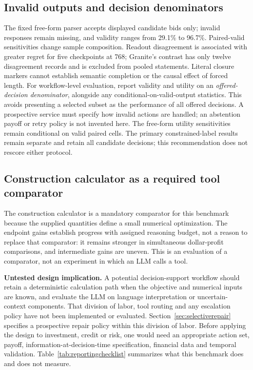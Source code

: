 \documentclass[sigconf,anonymous,nonacm]{acmart}
\begin{document}
\subsection{Invalid outputs and decision denominators}
The fixed free-form parser accepts displayed candidate bids only; invalid responses remain missing, and validity ranges from 29.1\% to 96.7\%. Paired-valid sensitivities change sample composition. Readout disagreement is associated with greater regret for five checkpoints at 768; Granite's contrast has only twelve disagreement records and is excluded from pooled statements. Literal closure markers cannot establish semantic completion or the causal effect of forced length.
For workflow-level evaluation, report validity and utility on an \emph{offered-decision denominator}, alongside any conditional-on-valid-output statistics. This avoids presenting a selected subset as the performance of all offered decisions. A prospective service must specify how invalid actions are handled; an abstention payoff or retry policy is not invented here. The free-form utility sensitivities remain conditional on valid paired cells. The primary constrained-label results remain separate and retain all candidate decisions; this recommendation does not rescore either protocol.

\subsection{Construction calculator as a required tool comparator}
The construction calculator is a mandatory comparator for this benchmark because the supplied quantities define a small numerical optimization. The endpoint gains establish progress with assigned reasoning budget, not a reason to replace that comparator: it remains stronger in simultaneous dollar-profit comparisons, and intermediate gains are uneven. This is an evaluation of a comparator, not an experiment in which an LLM calls a tool.

\textbf{Untested design implication.} A potential decision-support workflow should retain a deterministic calculation path when the objective and numerical inputs are known, and evaluate the LLM on language interpretation or uncertain-context components. That division of labor, tool routing and any escalation policy have not been implemented or evaluated. Section~\ref{sec:selectiverepair} specifies a prospective repair policy within this division of labor. Before applying the design to investment, credit or risk, one would need an appropriate action set, payoff, information-at-decision-time specification, financial data and temporal validation. Table~\ref{tab:reportingchecklist} summarizes what this benchmark does and does not measure.
\end{document}
